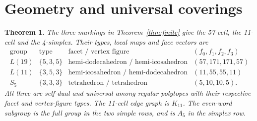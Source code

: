 \documentclass[11pt,a4paper]{article}
\newtheorem{theorem}{Theorem}
\begin{document}
\section{Geometry and universal coverings}
\begin{theorem}\label{thm:geometry}
The three markings in Theorem~\ref{thm:finite} give the 57-cell, the
11-cell and the 4-simplex. Their types, local maps and face vectors are
\[
\begin{array}{c|c|c|c}
\text{group}&\text{type}&\text{facet / vertex figure}&(f_0,f_1,f_2,f_3)\\
L(19)&\{5,3,5\}&\text{hemi-dodecahedron / hemi-icosahedron}&(57,171,171,57)\\
L(11)&\{3,5,3\}&\text{hemi-icosahedron / hemi-dodecahedron}&(11,55,55,11)\\
S_5&\{3,3,3\}&\text{tetrahedron / tetrahedron}&(5,10,10,5).
\end{array}
\]
All three are self-dual and universal among regular polytopes with their
respective facet and vertex-figure types. The 11-cell edge graph is
$K_{11}$. The even-word subgroup is the full group in the two simple
rows, and is $A_5$ in the simplex row.
\end{theorem}
\end{document}

